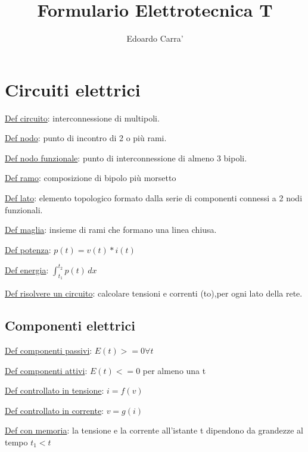 \documentclass{article}
\title{Formulario Elettrotecnica T}
\author{Edoardo Carra'}
\begin{document}
\maketitle

\section{Circuiti elettrici}
\noindent \underline{Def circuito}: interconnessione di multipoli.

\noindent \underline{Def nodo}: punto di incontro di 2 o più rami.

\noindent \underline{Def nodo funzionale}: punto di interconnessione di almeno 3 bipoli.

\noindent \underline{Def ramo}: composizione di bipolo più morsetto

\noindent \underline{Def lato}: elemento topologico formato dalla serie di componenti connessi a 2 nodi funzionali.

\noindent \underline{Def maglia}: insieme di rami che formano una linea chiusa.

\noindent \underline{Def potenza}: $p(t)=v(t)*i(t)$

\noindent \underline{Def energia}: $\int_{t_1}^{t_2} p(t) \,dx$

\noindent \underline{Def risolvere un circuito}: calcolare tensioni e correnti (to),per ogni lato della rete.


\medskip
\noindent{}

\subsection{Componenti elettrici}
\noindent \underline{Def componenti passivi}: $E(t) >= 0 \forall t$

\noindent \underline{Def componenti attivi}: $E(t) <= 0 $ per almeno una t

\noindent \underline{Def controllato in tensione}: $i=f(v)$

\noindent \underline{Def controllato in corrente}: $v=g(i)$

\noindent \underline{Def con memoria}: la tensione e la corrente all'istante t dipendono da grandezze al tempo $t_1 < t$
\end{document}
